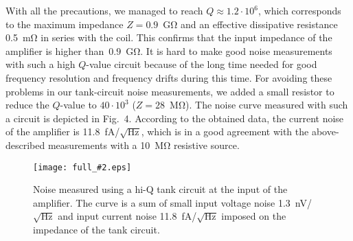 \documentclass{twocol}
\newcommand{\image}[3]{
\begin{figure}[#1]
\begin{center}
\texttt{[image: full\_\#2.eps]}
\caption{\small#3}
\label{image:#2}
\end{center}
\end{figure}
}
\begin{document}
With all the precautions, we managed to reach $Q\approx1.2\cdot10^6$,
which corresponds to the maximum impedance $Z=0.9$~G$\mathrm{\Omega}$ and
an effective dissipative resistance 0.5~m$\mathrm{\Omega}$ in series with
the coil. This confirms that the input impedance of the amplifier is
higher than~$0.9$~G$\mathrm{\Omega}$. It is hard to make good noise
measurements with such a high $Q$-value circuit because of the long time
needed for good frequency resolution and frequency drifts during this
time. For avoiding these problems in our tank-circuit noise measurements, 
we added a small resistor to reduce the $Q$-value to $40\cdot10^3$
($Z=28$~M$\mathrm{\Omega}$). The noise curve measured with such a circuit
is depicted in Fig.~4. According to the obtained data, the current noise
of the amplifier is 11.8~fA/$\sqrt{\mbox{Hz}}$, which is in a good
agreement with the above-described measurements with a
10~M$\mathrm{\Omega}$ resistive source.

\image{h!}{tank_circuit}{Noise measured using a hi-Q tank circuit at the
input of the amplifier. The curve is a sum of small input voltage noise 1.3~nV/$\sqrt{\mbox{Hz}}$
and input current noise 11.8~fA/$\sqrt{\mbox{Hz}}$ imposed on the impedance of the tank circuit. }
\end{document}
